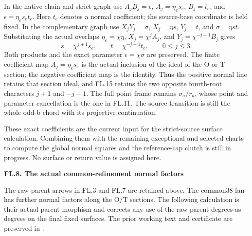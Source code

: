 \par\nobreak

In the native chain and strict graph use
\(A_jB_j=\epsilon\), \(A_j=\eta_e s_e\),
\(B_j=t_e\), and \(\epsilon=\eta_e s_et_e\).
Here \(t_e\) denotes a normal coefficient; the source-base
coordinate is held fixed. In the complementary graph use
\(X_jY_j=\sigma\), \(X_j=\eta s\), \(Y_j=t\),
and \(\sigma=\eta st\). Substituting the actual overlaps
\(\eta_e=\chi\eta\), \(X_j=\chi^jA_j\), and
\(Y_j=\chi^{-j-1}B_j\) gives
\[
 s=\chi^{j+1}s_e,\qquad t=\chi^{-j-1}t_e,
 \qquad 0\le j\le3.
 \tag{FL.15}
\]
Both products and the exact parameter \(\epsilon=\chi\sigma\)
are preserved. The finite coefficient map \(A_j=\eta_e s_e\)
is the actual inclusion of the ideal of the O or T section;
the negative coefficient map is the identity. Thus the
positive normal line retains that section ideal, and FL.15
retains the two opposite fourth-root characters \(j+1\)
and \(-j-1\). The full point frame remains
\(\sigma_a/r_a\), whose point and parameter cancellation
is the one in FL.11. The source transition is still the
whole odd-b chord with its projective continuation.

These exact coefficients are the current input for the
strict-source surface calculation. Combining them with
the remaining exceptional and selected charts to compute
the global normal squares and the reference-cap clutch
is still in progress. No surface or return value is
assigned here.

\par

\medskip\noindent\textbf{FL.8. The actual common-refinement normal factors}

\par\nobreak

The raw-parent arrows in FL.3 and FL.7 are retained above.
The common38 fan has further normal factors along the O/T
sections. The following calculation is their actual parent
morphism and corrects any use of the raw-parent degrees
as degrees on the final fixed surfaces. The prior working
text and certificate are preserved in
.

